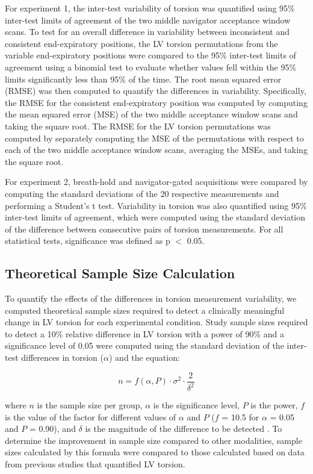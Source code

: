 	For experiment 1, the inter-test variability of torsion was quantified using 95\% inter-test limits of agreement of the two middle navigator acceptance window scans. To test for an overall difference in variability between inconsistent and consistent end-expiratory positions, the LV torsion permutations from the variable end-expiratory positions were compared to the 95\% inter-test limits of agreement using a binomial test to evaluate whether values fell within the 95\% limits significantly less than 95\% of the time. The root mean squared error (RMSE) was then computed to quantify the differences in variability. Specifically, the RMSE for the consistent end-expiratory position was computed by computing the mean squared error (MSE) of the two middle acceptance window scans and taking the square root. The RMSE for the LV torsion permutations was computed by separately computing the MSE of the permutations with respect to each of the two middle acceptance window scans, averaging the MSEs, and taking the square root.

	For experiment 2, breath-hold and navigator-gated acquisitions were compared by computing the standard deviations of the 20 respective measurements and performing a Student's t test. Variability in torsion was also quantified using 95\% inter-test limits of agreement, which were computed using the standard deviation of the difference between consecutive pairs of torsion measurements. For all statistical tests, significance was defined as p $<$ 0.05.

\subsection{Theoretical Sample Size Calculation}
	To quantify the effects of the differences in torsion measurement variability, we computed theoretical sample sizes required to detect a clinically meaningful change in LV torsion for each experimental condition. Study sample sizes required to detect a 10\% relative difference in LV torsion with a power of 90\% and a significance level of 0.05 were computed using the standard deviation of the inter-test differences in torsion ($\alpha$) and the equation:

	\begin{equation}
		n=f(\alpha,P)\cdot\sigma^2\cdot\frac{2}{\delta^2}
		\label{eq:samplesize}
	\end{equation}
	
	where $n$ is the sample size per group, $\alpha$ is the significance level, $P$ is the power, $f$ is the value of the factor for different values of $\alpha$ and $P$ ($f$ = 10.5 for $\alpha$ = 0.05 and $P$ = 0.90), and $\delta$ is the magnitude of the difference to be detected \cite{Grothues2002}. To determine the improvement in sample size compared to other modalities, sample sizes calculated by this formula were compared to those calculated based on data from previous studies that quantified LV torsion.

